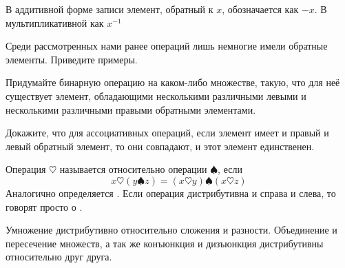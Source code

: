 В аддитивной форме записи элемент, обратный к $x$, обозначается как $-x$. В мультипликативной как $x^{-1}$

\begin{exercise}
Среди рассмотренных нами ранее операций лишь немногие имели обратные элементы. Приведите примеры.
\end{exercise}

\begin{exercise}
Придумайте бинарную операцию на каком-либо множестве, такую, что для неё существует элемент, обладающими несколькими различными левыми и несколькими различными правыми обратными элементами.
\end{exercise}

\begin{exercise}
Докажите, что для ассоциативных операций, если элемент имеет и правый и левый обратный элемент, то они совпадают, и этот элемент единственен.
\end{exercise}

\begin{definition}
Операция $\heartsuit$ называется  относительно операции $\spadesuit$, если
$$x\heartsuit (y\spadesuit z) = (x\heartsuit y) \spadesuit (x \heartsuit z)$$
Аналогично определяется . Если операция дистрибутивна и справа и слева, то говорят просто о .
\end{definition}

\begin{example}
Умножение дистрибутивно относительно сложения и разности. Объединение и пересечение множеств, а так же конъюнкция и дизъюнкция дистрибутивны относительно друг друга.
\end{example}